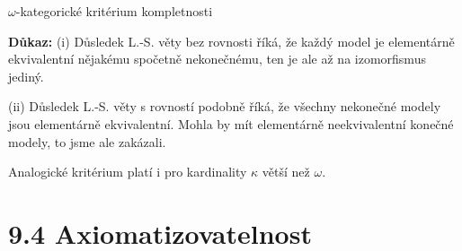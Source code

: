 \documentclass{beamer}
\begin{document}
\begin{frame}{$\omega$-kategorické kritérium kompletnosti}


    \pause

    \pause
    \textbf{Důkaz:}\pause
    \alert{(i)} Důsledek L.-S. věty bez rovnosti říká, že každý model je elementárně ekvivalentní nějakému spočetně nekonečnému, ten je ale až na izomorfismus jediný.\pause
    
    \alert{(ii)} \pause Důsledek L.-S. věty s rovností podobně říká, že všechny nekonečné modely jsou elementárně ekvivalentní. Mohla by mít elementárně neekvivalentní konečné modely, to jsme ale zakázali. \hfill\qedsymbol

    \medskip

    \pause

    \pause
    Analogické kritérium platí i pro kardinality $\kappa$ větší než $\omega$.

\end{frame}


\section{9.4 Axiomatizovatelnost}
\end{document}
